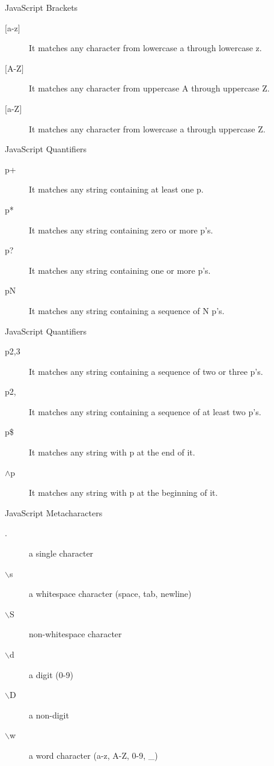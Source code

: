 \documentclass[14pt]{beamer}
\begin{document}
\begin{frame}{JavaScript}
Brackets
\begin{description}
 \item [$\lbrack$a-z$\rbrack$] It matches any character from lowercase a through lowercase z.
 \item [$\lbrack$A-Z$\rbrack$] It matches any character from uppercase A through uppercase Z.
 \item [$\lbrack$a-Z$\rbrack$] It matches any character from lowercase a through uppercase Z.
\end{description}
\end{frame}

\begin{frame}{JavaScript}
Quantifiers
\begin{description}
 \item [p+] It matches any string containing at least one p.
 \item [p*] It matches any string containing zero or more p's.
 \item [p?] It matches any string containing one or more p's.
 \item [p{N}] It matches any string containing a sequence of N p's.
\end{description}
\end{frame}

\begin{frame}{JavaScript}
Quantifiers
\begin{description}
 \item [p{2,3}] It matches any string containing a sequence of two or three p's.
 \item [p{2, }] It matches any string containing a sequence of at least two p's.
 \item [p\$] It matches any string with p at the end of it.
 \item [$\wedge$p] It matches any string with p at the beginning of it.
\end{description}
\end{frame}

\begin{frame}{JavaScript}
Metacharacters
\begin{description}
 \item [.] a single character
 \item [$\backslash$s] a whitespace character (space, tab, newline)
 \item [$\backslash$S] non-whitespace character
 \item [$\backslash$d] a digit (0-9)
 \item [$\backslash$D] a non-digit
 \item [$\backslash$w] a word character (a-z, A-Z, 0-9, \_)
\end{description}
\end{frame}
\end{document}
